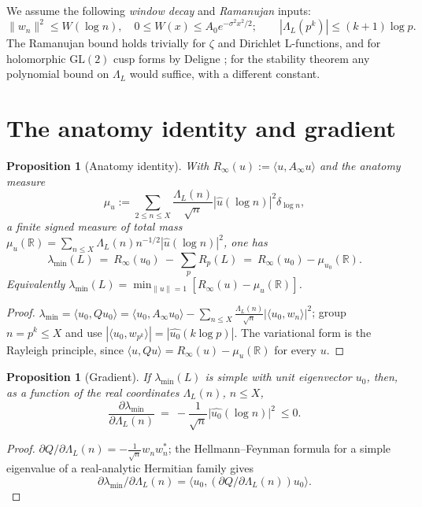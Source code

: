 \documentclass[11pt]{amsart}
\newtheorem{proposition}[theorem]{Proposition}
\theoremstyle{definition}
\theoremstyle{remark}
\newcommand{\lmin}{\lambda_{\min}}
\newcommand{\Norm}[1]{\lVert #1\rVert}
\begin{document}
We assume the following \emph{window decay} and \emph{Ramanujan} inputs:
\begin{equation}\label{eq:inputs}
\Norm{w_n}^2\le W(\log n),\quad 0\le W(x)\le A_0 e^{-\sigma^2 x^2/2}; \qquad |\Lambda_L(p^k)|\le (k+1)\log p .
\end{equation}
The Ramanujan bound holds trivially for $\zeta$ and Dirichlet L-functions, and for holomorphic
$\mathrm{GL}(2)$ cusp forms by Deligne \cite{Deligne}; for the stability theorem any polynomial bound on
$\Lambda_L$ would suffice, with a different constant.

\section{The anatomy identity and gradient}\label{sec:anat}
\begin{proposition}[Anatomy identity]\label{prop:anat}
With $R_\infty(u):=\langle u,A_\infty u\rangle$ and the \emph{anatomy measure}
\[
\mu_u:=\sum_{2\le n\le X}\frac{\Lambda_L(n)}{\sqrt n}|\widehat u(\log n)|^2\delta_{\log n},
\]
a finite signed measure of total mass
$\mu_u(\mathbb R)=\sum_{n\le X}\Lambda_L(n)n^{-1/2}|\widehat u(\log n)|^2$, one has
\[
\lmin(L)\ =\ R_\infty(u_0)\ -\ \sum_p R_p(L)\ =\ R_\infty(u_0)-\mu_{u_0}(\mathbb R).
\]
Equivalently $\lmin(L)=\min_{\Norm u=1}[R_\infty(u)-\mu_u(\mathbb R)]$.
\end{proposition}
\begin{proof}
$\lmin=\langle u_0,Qu_0\rangle=\langle u_0,A_\infty u_0\rangle-\sum_{n\le X}\frac{\Lambda_L(n)}{\sqrt n}|\langle u_0,w_n\rangle|^2$;
group $n=p^k\le X$ and use $|\langle u_0,w_{p^k}\rangle|=|\widehat{u_0}(k\log p)|$. The variational form is
the Rayleigh principle, since $\langle u,Qu\rangle=R_\infty(u)-\mu_u(\mathbb R)$ for every $u$. \end{proof}

\begin{proposition}[Gradient]\label{prop:grad}
If $\lmin(L)$ is simple with unit eigenvector $u_0$, then, as a function of the real coordinates
$\Lambda_L(n)$, $n\le X$,
\[
\frac{\partial\lmin}{\partial\Lambda_L(n)}\ =\ -\frac{1}{\sqrt n}\big|\widehat{u_0}(\log n)\big|^2\ \le 0 .
\]
\end{proposition}
\begin{proof}
$\partial Q/\partial\Lambda_L(n)=-\tfrac1{\sqrt n}w_nw_n^{*}$; the Hellmann--Feynman formula for a simple
eigenvalue of a real-analytic Hermitian family \cite[Ch.~II]{Kato} gives
\[
\partial\lmin/\partial\Lambda_L(n)=\langle u_0,(\partial Q/\partial\Lambda_L(n))u_0\rangle.
\]
\end{proof}
\end{document}
